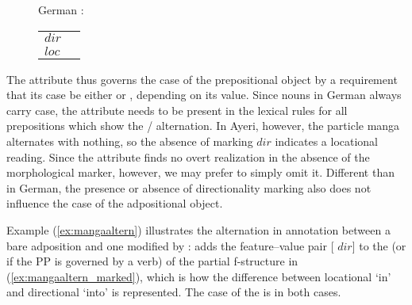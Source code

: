 \begin{figure}[h]
\ex\label{ex:gercasealt}%
German \citep{butt2005}:\medskip\\
\begin{tabular}[t]{@{} l @{ $\implies$ } l}
\PSem{} $dir$ & \ups{\Obj{} \Case{}} \req{} \Acc{} \\
\PSem{} $loc$ & \ups{\Obj{} \Case{}} \req{} \Dat{} \\
\end{tabular}
\xe
\end{figure}

The \PSem{} attribute thus governs the case of the prepositional object by a
requirement that its case be either \Acc{} or \Dat{}, depending on its value.
Since nouns in German always carry case, the \PSem{} attribute needs to be
present in the lexical rules for all prepositions which show the \Acc{}/\Dat{}
alternation. %
In Ayeri, however, the particle  {manga} alternates with nothing, so
the absence of marking $dir$ indicates a locational reading. Since the \PSem{}
attribute finds no overt realization in the absence of the morphological
marker, however, we may prefer to simply omit it. Different than in German, the
presence or absence of directionality marking also does not influence the case
of the adpositional object.

Example (\ref{ex:mangaaltern}) illustrates the alternation in annotation
between a bare adposition and one modified by :
 adds the feature--value pair [\PSem{} $dir$] to the \Adjc{} 
(or \Oblique{} if the PP is governed by a verb) of the partial f-structure in 
(\ref{ex:mangaaltern_marked}), which is how the difference between locational
`in' and directional `into' is represented. The case of the \Obj{} is \Loc{} in
both cases.

